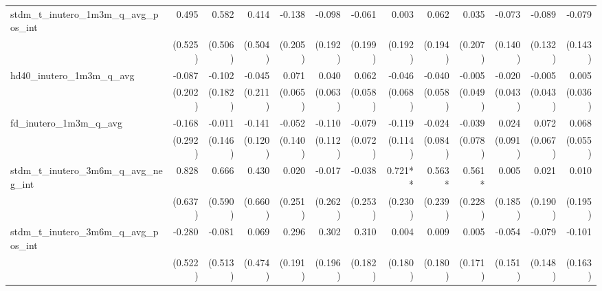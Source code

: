 \begin{tabular}{lrrrrrrrrrrrr}
stdm\_t\_inutero\_1m3m\_q\_avg\_pos\_int    &        0.495 &        0.582 &        0.414 &       -0.138 &       -0.098 &       -0.061 &        0.003 &        0.062 &        0.035 &       -0.073 &       -0.089 &       -0.079 \\ 
                                            &      (0.525) &      (0.506) &      (0.504) &      (0.205) &      (0.192) &      (0.199) &      (0.192) &      (0.194) &      (0.207) &      (0.140) &      (0.132) &      (0.143) \\ 
hd40\_inutero\_1m3m\_q\_avg                 &       -0.087 &       -0.102 &       -0.045 &        0.071 &        0.040 &        0.062 &       -0.046 &       -0.040 &       -0.005 &       -0.020 &       -0.005 &        0.005 \\ 
                                            &      (0.202) &      (0.182) &      (0.211) &      (0.065) &      (0.063) &      (0.058) &      (0.068) &      (0.058) &      (0.049) &      (0.043) &      (0.043) &      (0.036) \\ 
fd\_inutero\_1m3m\_q\_avg                   &       -0.168 &       -0.011 &       -0.141 &       -0.052 &       -0.110 &       -0.079 &       -0.119 &       -0.024 &       -0.039 &        0.024 &        0.072 &        0.068 \\ 
                                            &      (0.292) &      (0.146) &      (0.120) &      (0.140) &      (0.112) &      (0.072) &      (0.114) &      (0.084) &      (0.078) &      (0.091) &      (0.067) &      (0.055) \\ 
stdm\_t\_inutero\_3m6m\_q\_avg\_neg\_int    &        0.828 &        0.666 &        0.430 &        0.020 &       -0.017 &       -0.038 &      0.721** &       0.563* &       0.561* &        0.005 &        0.021 &        0.010 \\ 
                                            &      (0.637) &      (0.590) &      (0.660) &      (0.251) &      (0.262) &      (0.253) &      (0.230) &      (0.239) &      (0.228) &      (0.185) &      (0.190) &      (0.195) \\ 
stdm\_t\_inutero\_3m6m\_q\_avg\_pos\_int    &       -0.280 &       -0.081 &        0.069 &        0.296 &        0.302 &        0.310 &        0.004 &        0.009 &        0.005 &       -0.054 &       -0.079 &       -0.101 \\ 
                                            &      (0.522) &      (0.513) &      (0.474) &      (0.191) &      (0.196) &      (0.182) &      (0.180) &      (0.180) &      (0.171) &      (0.151) &      (0.148) &      (0.163) \\ 

\end{tabular}
